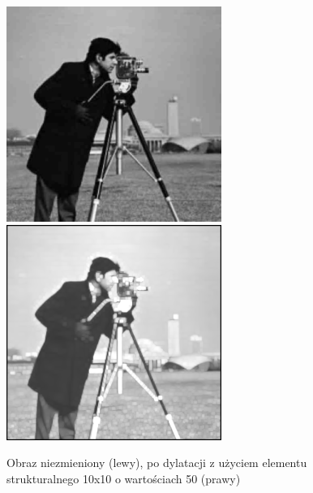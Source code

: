 \documentclass[a4paper,12pt]{book}
\begin{document}
\begin{figure}[H]
	\caption{Obraz niezmieniony (lewy), po dylatacji z użyciem elementu strukturalnego 10x10 o wartościach 50 (prawy)}
	\includegraphics[width=7cm, height=7cm]{man-unmodified.jpg}
	\includegraphics[width=7cm, height=7cm]{morph-gray-dilation-strel10x10-50.png}
\end{figure}
\end{document}
